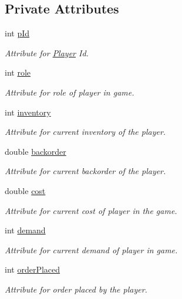 \subsection*{Private Attributes}
\begin{DoxyCompactItemize}
\item 
int \hyperlink{class_player_aa450b5b5cdda7cae086fb28a78d1fb8c}{p\+Id}
\begin{DoxyCompactList}\small\item\em Attribute for \hyperlink{class_player}{Player} Id. \end{DoxyCompactList}\item 
int \hyperlink{class_player_a3544f9c49c57c160a3edae988d1fae42}{role}
\begin{DoxyCompactList}\small\item\em Attribute for role of player in game. \end{DoxyCompactList}\item 
int \hyperlink{class_player_a68e4cf30506015d9291ffc4c1c5b1078}{inventory}
\begin{DoxyCompactList}\small\item\em Attribute for current inventory of the player. \end{DoxyCompactList}\item 
double \hyperlink{class_player_a691751190c6389e1aef1b5b949cb11b7}{backorder}
\begin{DoxyCompactList}\small\item\em Attribute for current backorder of the player. \end{DoxyCompactList}\item 
double \hyperlink{class_player_a7477b3893f2805a36042e96b4aeb2151}{cost}
\begin{DoxyCompactList}\small\item\em Attribute for current cost of player in the game. \end{DoxyCompactList}\item 
int \hyperlink{class_player_aec98bfa93606a2b7cf4978c7d500917b}{demand}
\begin{DoxyCompactList}\small\item\em Attribute for current demand of player in game. \end{DoxyCompactList}\item 
int \hyperlink{class_player_a5ce498c11486dc2994a9ab7f3ba24260}{order\+Placed}
\begin{DoxyCompactList}\small\item\em Attribute for order placed by the player. \end{DoxyCompactList}\end{DoxyCompactItemize}


